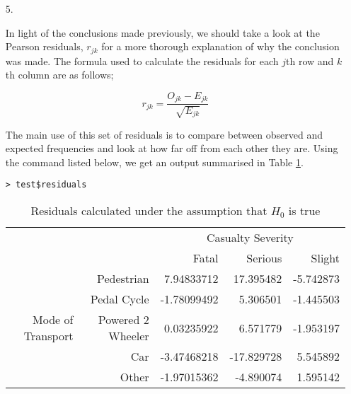 \documentclass[11pt,a4]{article}
\begin{document}
\begin{enumerate}
With these values, we are able calculate the $X^2$ statistic manually. However, with the \verb|chisq.test| command, we immediately are provided with it. To conduct the test, it is important to note that the statistic follows the following distribution:

\[ X^2 \sim {\chi}^2 (8)\]

For a 5\% significance level test, we will be comparing the $X^2$ statistic with the value of the $95$th quantile in the stated distribution.

\begin{verbatim}
> qchisq(0.95, df = 8)
[1] 15.50731
\end{verbatim}

From there, it is very clear that the statistic, $X^2 = 870.25 > 15.50731$. Therefore, there is sufficient evidence for us to reject the null hypothesis in favour of the alternate one. To answer the question of interest, the three probabilities in the five Multinomial distributions are \emph{not} identical.

\item[5.]

In light of the conclusions made previously, we should take a look at the Pearson residuals, $r_{jk}$ for a more thorough explanation of why the conclusion was made. The formula used to calculate the residuals for each $j$th row and $k$th column are as follows; 

\[ r_{jk} = \frac{O_{jk} - E_{jk}}{\sqrt{E_{jk}}} \]

The main use of this set of residuals is to compare between observed and expected frequencies and look at how far off from each other they are. Using the command listed below, we get an output summarised in Table \ref{tab4}.


\begin{verbatim}
> test$residuals
  \end{verbatim}

\begin{table}[ht]
\centering
\begin{tabular}{rr|rrr}
    \multicolumn{2}{c}{\multirow{2}{*}{}}&\multicolumn{3}{|c}{Casualty Severity} \\
    \multicolumn{2}{c|}{}& Fatal & Serious & Slight\\
  \hline
  \multirow{5}{*}{Mode of Transport} & Pedestrian & 7.94833712 & 17.395482 & -5.742873\\ 
  & Pedal Cycle &  -1.78099492 & 5.306501 & -1.445503 \\ 
  & Powered 2 Wheeler & 0.03235922 & 6.571779 & -1.953197 \\ 
  & Car & -3.47468218 & -17.829728 & 5.545892 \\ 
  & Other & -1.97015362 & -4.890074 & 1.595142 \\ 
   \hline
\end{tabular}
\caption{Residuals calculated under the assumption that $H_{0}$ is true}
\label{tab4}
\end{table}


\end{enumerate}
\end{document}
